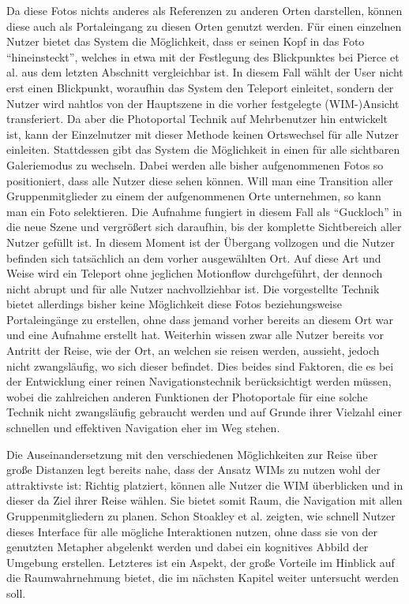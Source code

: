 Da diese Fotos nichts anderes als Referenzen zu anderen Orten darstellen, können diese auch als Portaleingang zu diesen Orten genutzt werden.
Für einen einzelnen Nutzer bietet das System die Möglichkeit, dass er seinen Kopf in das Foto “hineinsteckt”, welches in etwa mit der Festlegung des Blickpunktes bei Pierce et al. aus dem letzten Abschnitt vergleichbar ist. In diesem Fall wählt der User nicht erst einen Blickpunkt, woraufhin das System den Teleport einleitet, sondern der Nutzer wird nahtlos von der Hauptszene in die vorher festgelegte (WIM-)Ansicht transferiert. Da aber die Photoportal Technik auf Mehrbenutzer hin entwickelt ist, kann der Einzelnutzer mit dieser Methode keinen Ortswechsel für alle Nutzer einleiten. Stattdessen gibt das System die Möglichkeit in einen für alle sichtbaren Galeriemodus zu wechseln. Dabei werden alle bisher aufgenommenen Fotos so positioniert, dass alle Nutzer diese sehen können. Will man eine Transition aller Gruppenmitglieder zu einem der aufgenommenen Orte unternehmen, so kann man ein Foto selektieren. Die Aufnahme fungiert in diesem Fall als “Guckloch” in die neue Szene und vergrößert sich daraufhin, bis der komplette Sichtbereich aller Nutzer gefüllt ist. In diesem Moment ist der Übergang vollzogen und die Nutzer befinden sich tatsächlich an dem vorher ausgewählten Ort. 
Auf diese Art und Weise wird ein Teleport ohne jeglichen Motionflow durchgeführt, der dennoch nicht abrupt und für alle Nutzer nachvollziehbar ist.
Die vorgestellte Technik bietet allerdings bisher keine Möglichkeit diese Fotos beziehungsweise Portaleingänge zu erstellen, ohne dass jemand vorher bereits an diesem Ort war und eine Aufnahme erstellt hat. Weiterhin wissen zwar alle Nutzer bereits vor Antritt der Reise, wie der Ort, an welchen sie reisen werden, aussieht, jedoch nicht zwangsläufig, wo sich dieser befindet.
Dies beides sind Faktoren, die es bei der Entwicklung einer reinen Navigationstechnik berücksichtigt werden müssen, wobei die zahlreichen anderen Funktionen der Photoportale für eine solche Technik nicht zwangsläufig gebraucht werden und auf Grunde ihrer Vielzahl einer schnellen und effektiven Navigation eher im Weg stehen.

Die Auseinandersetzung mit den verschiedenen Möglichkeiten zur Reise über große Distanzen legt bereits nahe, dass der Ansatz WIMs zu nutzen wohl der attraktivste ist:
Richtig platziert, können alle Nutzer die WIM überblicken und in dieser da Ziel ihrer Reise wählen. Sie bietet somit Raum, die Navigation mit allen Gruppenmitgliedern zu planen. Schon Stoakley et al. zeigten, wie schnell Nutzer dieses Interface für alle mögliche Interaktionen nutzen, ohne dass sie von der genutzten Metapher abgelenkt werden und dabei ein kognitives Abbild der Umgebung erstellen. 
Letzteres ist ein Aspekt, der große Vorteile im Hinblick auf die Raumwahrnehmung bietet, die im nächsten Kapitel weiter untersucht werden soll.
